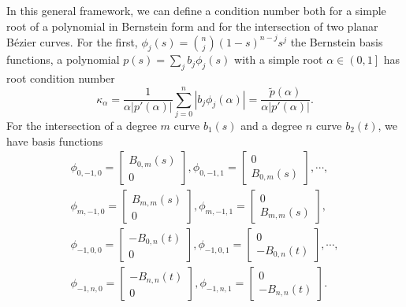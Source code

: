 In this general framework, we can define a condition number both
for a simple root of a polynomial in Bernstein form and for the
intersection of two planar B\'{e}zier curves. For the first,
\(\phi_j(s) = \binom{n}{j} (1 - s)^{n - j} s^j\) the Bernstein basis
functions, a polynomial \(p(s) = \sum_j b_j \phi_j(s)\) with
a simple root \(\alpha \in \left(0, 1\right]\) has root condition number
\begin{equation}
\kappa_{\alpha} =
  \frac{1}{\alpha \left|p'(\alpha)\right|} \sum_{j = 0}^n \left|
  b_j \phi_j(\alpha)\right| = \frac{\widetilde{p}(\alpha)}{
  \alpha \left|p'(\alpha)\right|}.
\end{equation}
For the intersection of a degree \(m\) curve \(b_1(s)\) and
a degree \(n\) curve \(b_2(t)\), we have basis functions
\begin{multline}
\phi_{0, -1, 0} = \left[ \begin{array}{c} B_{0, m}(s) \\ 0 \end{array}\right],
\phi_{0, -1, 1} = \left[ \begin{array}{c} 0 \\ B_{0, m}(s) \end{array}\right],
\cdots, \\
\phi_{m, -1, 0} = \left[ \begin{array}{c} B_{m, m}(s) \\ 0 \end{array}\right],
\phi_{m, -1, 1} = \left[ \begin{array}{c} 0 \\
  B_{m, m}(s) \end{array}\right], \\
\phi_{-1, 0, 0} = \left[ \begin{array}{c} -B_{0, n}(t) \\
  0 \end{array}\right],
\phi_{-1, 0, 1} = \left[ \begin{array}{c} 0 \\
  -B_{0, n}(t) \end{array}\right], \cdots, \\
\phi_{-1, n, 0} = \left[ \begin{array}{c} -B_{n, n}(t) \\
  0 \end{array}\right], \phi_{-1, n, 1} = \left[ \begin{array}{c} 0 \\
  -B_{n, n}(t) \end{array}\right].
\end{multline}
